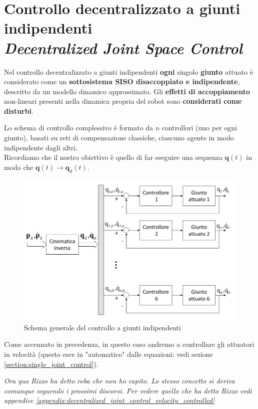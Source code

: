\section[Controllo decentralizzato a giunti indipendenti]{Controllo decentralizzato a giunti indipendenti \\ {\small \textit{Decentralized Joint Space Control}}}

Nel controllo decentralizzato a giunti indipendenti \textbf{ogni} singolo \textbf{giunto} attuato è considerato come un \textbf{sottosistema SISO disaccoppiato e indipendente}, descritto da un modello dinamico approssimato. Gli \textbf{effetti di accoppiamento} non-lineari presenti nella dinamica propria del robot sono \textbf{considerati come disturbi}.

Lo schema di controllo complessivo è formato da $n$ controllori (uno per ogni giunto), basati su reti di compensazione classiche, ciascuno agente in modo indipendente dagli altri.\\
Ricordiamo che il nostro obiettivo è quello di far eseguire una sequenza $\mathbf{q}(t)$ in modo che $\mathbf{q}(t) \to \mathbf{q}_d(t)$.\\	


\begin{figure}[th!]
	\centering
	\includegraphics[width=0.7\linewidth]{images/decentralized_joint_space_control_1}
	\caption{Schema generale del controllo a giunti indipendenti}
	\label{fig:decentralizedjointspacecontrol1}
\end{figure}


Come accennato in precedenza, in questo caso andremo a controllare gli attuatori in velocità (questo esce in "automatico" dalle equazioni: vedi sezione \ref{section:single_joint_control}).

\textit{Ora qua Rizzo ha detto roba che non ho capito. Lo stesso concetto si deriva comunque seguendo i prossimi discorsi. Per vedere quello che ha detto Rizzo vedi appendice \ref{appendix:decentralized_joint_control_velocity_controlled}}

